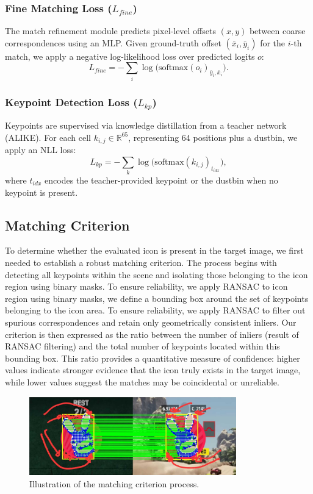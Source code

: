 \subsubsection{Fine Matching Loss ($L_{fine}$)}
The match refinement module predicts pixel-level offsets $(x,y)$ between coarse correspondences using an MLP.
Given ground-truth offset $(\bar{x}_i, \bar{y}_i)$ for the $i$-th match, we apply a negative log-likelihood loss over predicted logits $o$:
\begin{equation}
    L_{fine} = - \sum_i \log \big( \text{softmax}(o_i)_{\bar{y}_i, \bar{x}_i} \big).
\end{equation}

\subsubsection{Keypoint Detection Loss ($L_{kp}$)}
Keypoints are supervised via knowledge distillation from a teacher network (ALIKE).
For each cell $k_{i,j} \in \mathbb{R}^{65}$, representing 64 positions plus a dustbin, we apply an NLL loss:
\begin{equation}
    L_{kp} = - \sum_k \log \big( \text{softmax}(k_{i,j})_{t_{idx}} \big),
\end{equation}
where $t_{idx}$ encodes the teacher-provided keypoint or the dustbin when no keypoint is present.
\pagebreak
\medskip
\subsection{Matching Criterion}
To determine whether the evaluated icon is present in the target image, we
first needed to establish a robust matching criterion. The process begins with
detecting all keypoints within the scene and isolating those belonging to the
icon region using binary masks. To ensure reliability, we apply RANSAC to
icon region using binary masks, we define a bounding box around the set of keypoints belonging to the icon area. To ensure reliability, we apply RANSAC to
filter out spurious correspondences and retain only geometrically consistent
inliers. Our criterion is then expressed as the ratio between the number of inliers (result of RANSAC filtering) and
the total number of keypoints located within this bounding box. This ratio
provides a quantitative measure of confidence: higher values indicate stronger
evidence that the icon truly exists in the target image, while lower values
suggest the matches may be coincidental or unreliable.
\begin{figure}[H]
    \centering
    \includegraphics[width=0.8\textwidth]{ressources/test (1).jpg}
    \caption{Illustration of the matching criterion process.}
    \label{fig:matching_criterion}
\end{figure}
